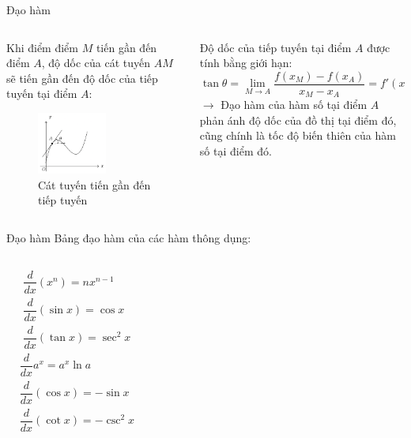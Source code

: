 \begin{frame}{Đạo hàm}
    \begin{columns}
        \begin{column}{0.5\textwidth}
Khi điểm điểm \(M\) tiến gần đến điểm \(A\), độ dốc của cát tuyến \(AM\) sẽ tiến gần đến độ dốc của tiếp tuyến tại điểm \(A\):
\begin{figure}
    \centering
    \includegraphics[width=0.6\textwidth]{Slides/figure/tieptuyen.png}
    \caption{Cát tuyến tiến gần đến tiếp tuyến}
\end{figure}
        \end{column}
        \begin{column}{0.5\textwidth}
Độ dốc của tiếp tuyến tại điểm \(A\) được tính bằng giới hạn:
\begin{equation}
    \tan\theta=\lim_{M\to A}\dfrac{f(x_M)-f(x_A)}{x_M-x_A}=f'(x_A)
\end{equation}
\(\longrightarrow\) Đạo hàm của hàm số tại điểm \(A\) phản ánh độ dốc của đồ thị tại điểm đó, cũng chính là tốc độ biến thiên của hàm số tại điểm đó.
        \end{column}
    \end{columns}
\end{frame}
\begin{frame}{Đạo hàm}
    Bảng đạo hàm của các hàm thông dụng:
    \begin{tcolorbox}[colback=blue!10, colframe=blue!50!black, title=]
    \begin{columns}
        \[
        \begin{aligned}
            &\dfrac{d}{dx}(x^n)=nx^{n-1}\\
            &\dfrac{d}{dx}(\sin x)=\cos x\\
            &\dfrac{d}{dx}(\tan x)=\sec^2 x
        \end{aligned}
        \]
    \[
    \begin{aligned}
        &\dfrac{d}{dx}a^x=a^x \ln a\\
        &\dfrac{d}{dx}(\cos x)=-\sin x\\
        &\dfrac{d}{dx}(\cot x)=-\csc^2 x
        \end{aligned}
    \]
    \end{columns}
    \end{tcolorbox}
    \end{frame}

